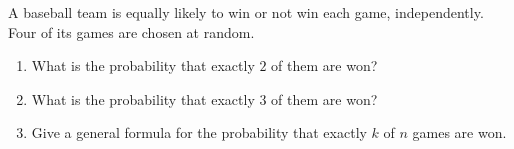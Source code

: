 A baseball team is equally likely to win or not win each game, independently. Four of its games are chosen at random.
\begin{enumerate}
\item[(a)] What is the probability that exactly $2$ of them are won?
\item[(b)] What is the probability that exactly $3$ of them are won?
\item[(c)] Give a general formula for the probability that exactly $k$ of $n$ games are won.
\end{enumerate}
